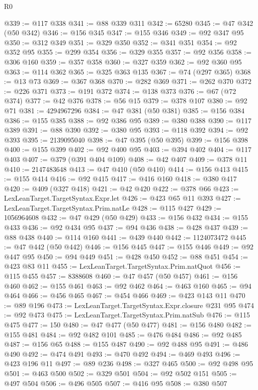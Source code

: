 \begin{lexlean}{R0}
\begin{coremodule}
@339 := @117 @338
@341 := @88 @339 @311
@342 := 65280
@345 := @47 @342 (@50 @342)
@346 := @156 @345
@347 := @155 @346
@349 := @92 @347 @95
@350 := @312 @349
@351 := @329 @350
@352 := @341 @351
@354 := @92 @352 @95
@355 := @299 @354
@356 := @329 @355
@357 := @92 @356
@358 := @306 @160
@359 := @357 @358
@360 := @327 @359
@362 := @92 @360 @95
@363 := @114 @362
@365 := @325 @363 @135
@367 := @74 (@297 @365)
@368 := @13 @73
@369 := @367 @368
@370 := @282 @369
@371 := @262 @370
@372 := @226 @371
@373 := @191 @372
@374 := @138 @373
@376 := @67 (@72 @374)
@377 := @42 @376
@378 := @56 @15
@379 := @378 @107
@380 := @92 @71
@381 := 4294967296
@384 := @47 @381 (@50 @381)
@385 := @156 @384
@386 := @155 @385
@388 := @92 @386 @95
@389 := @380 @388
@390 := @117 @389
@391 := @88 @390
@392 := @380 @95
@393 := @118 @392
@394 := @92 @393
@395 := 2139095040
@398 := @47 @395 (@50 @395)
@399 := @156 @398
@400 := @155 @399
@402 := @92 @400 @95
@403 := @394 @402
@404 := @117 @403
@407 := @379 (@391 @404 @109)
@408 := @42 @407
@409 := @378 @11
@410 := 2147483648
@413 := @47 @410 (@50 @410)
@414 := @156 @413
@415 := @155 @414
@416 := @92 @415
@417 := @416 @160
@418 := @380 @417
@420 := @409 (@327 @418)
@421 := @42 @420
@422 := @378 @66
@423 := LexLeanTarget.TargetSyntax.Expr.let
@426 := @423 @65 @11 @393
@427 := LexLeanTarget.TargetSyntax.Prim.natLe
@428 := @115 @427
@429 := 1056964608
@432 := @47 @429 (@50 @429)
@433 := @156 @432
@434 := @155 @433
@436 := @92 @434 @95
@437 := @94 @436
@438 := @428 @437
@439 := @88 @438
@440 := @114 @160
@441 := @439 @440
@442 := 1124073472
@445 := @47 @442 (@50 @442)
@446 := @156 @445
@447 := @155 @446
@449 := @92 @447 @95
@450 := @94 @449
@451 := @428 @450
@452 := @88 @451
@454 := @423 @83 @11
@455 := LexLeanTarget.TargetSyntax.Prim.natQuot
@456 := @115 @455
@457 := 8388608
@460 := @47 @457 (@50 @457)
@461 := @156 @460
@462 := @155 @461
@463 := @92 @462
@464 := @463 @160
@465 := @94 @464
@466 := @456 @465
@467 := @454 @466
@469 := @423 @143 @11
@470 := @89 @196
@473 := LexLeanTarget.TargetSyntax.Expr.closure @231 @95
@474 := @92 @473
@475 := LexLeanTarget.TargetSyntax.Prim.natSub
@476 := @115 @475
@477 := 150
@480 := @47 @477 (@50 @477)
@481 := @156 @480
@482 := @155 @481
@484 := @92 @482 @101
@485 := @476 @484
@486 := @92 @485
@487 := @156 @65
@488 := @155 @487
@490 := @92 @488 @95
@491 := @486 @490
@492 := @474 @491
@493 := @470 @492
@494 := @469 @493
@496 := @423 @196 @11
@497 := @89 @236
@498 := @327 @465
@500 := @92 @498 @95
@501 := @463 @500
@502 := @329 @501
@504 := @92 @502 @151
@505 := @497 @504
@506 := @496 @505
@507 := @416 @95
@508 := @380 @507

\end{coremodule}
\end{lexlean}
